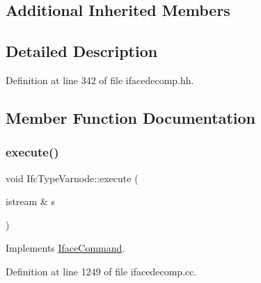 \subsection*{Additional Inherited Members}


\subsection{Detailed Description}


Definition at line 342 of file ifacedecomp.\+hh.



\subsection{Member Function Documentation}
\mbox{\label{class_ifc_type_varnode_a121ff1e507f74d6ec86a07e120cd3ba8}} 
\subsubsection{\texorpdfstring{execute()}{execute()}}
{\footnotesize\ttfamily void Ifc\+Type\+Varnode\+::execute (\begin{DoxyParamCaption}\item[{istream \&}]{s }\end{DoxyParamCaption})\hspace{0.3cm}{\ttfamily [virtual]}}



Implements \mbox{\hyperlink{class_iface_command_af10e29cee2c8e419de6efe9e680ad201}{Iface\+Command}}.



Definition at line 1249 of file ifacedecomp.\+cc.

